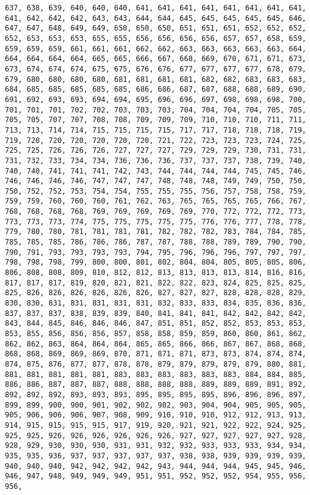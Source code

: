 \documentclass[11pt]{article}
\begin{document}
\begin{Verbatim}[commandchars=\\\{\}]
637, 638, 639, 640, 640, 640, 641, 641, 641, 641, 641, 641, 641, 641, 641, 642, 642, 642, 643, 643, 644, 644, 645, 645, 645, 645, 645, 646, 647, 647, 648, 649, 649, 650, 650, 650, 651, 651, 651, 652, 652, 652, 652, 653, 653, 653, 655, 655, 656, 656, 656, 656, 657, 657, 658, 659, 659, 659, 659, 661, 661, 661, 662, 662, 663, 663, 663, 663, 663, 664, 664, 664, 664, 664, 665, 665, 666, 667, 668, 669, 670, 671, 671, 673, 673, 674, 674, 674, 675, 675, 676, 676, 677, 677, 677, 677, 678, 679, 679, 680, 680, 680, 680, 681, 681, 681, 681, 682, 682, 683, 683, 683, 684, 685, 685, 685, 685, 685, 686, 686, 687, 687, 688, 688, 689, 690, 691, 692, 693, 693, 694, 694, 695, 696, 696, 697, 698, 698, 698, 700, 701, 701, 701, 702, 702, 703, 703, 703, 704, 704, 704, 704, 705, 705, 705, 705, 707, 707, 708, 708, 709, 709, 709, 710, 710, 710, 711, 711, 713, 713, 714, 714, 715, 715, 715, 715, 717, 717, 718, 718, 718, 719, 719, 720, 720, 720, 720, 720, 720, 721, 722, 723, 723, 723, 724, 725, 725, 725, 726, 726, 726, 727, 727, 727, 729, 729, 729, 730, 731, 731, 731, 732, 733, 734, 734, 736, 736, 736, 737, 737, 737, 738, 739, 740, 740, 740, 741, 741, 741, 742, 743, 744, 744, 744, 744, 745, 745, 746, 746, 746, 746, 746, 747, 747, 747, 748, 748, 748, 749, 749, 750, 750, 750, 752, 752, 753, 754, 754, 755, 755, 755, 756, 757, 758, 758, 759, 759, 759, 760, 760, 760, 761, 762, 763, 765, 765, 765, 765, 766, 767, 768, 768, 768, 768, 769, 769, 769, 769, 769, 770, 772, 772, 772, 773, 773, 773, 773, 774, 775, 775, 775, 775, 775, 776, 776, 777, 778, 778, 779, 780, 780, 781, 781, 781, 781, 782, 782, 782, 783, 784, 784, 785, 785, 785, 785, 786, 786, 786, 787, 787, 788, 788, 789, 789, 790, 790, 790, 791, 793, 793, 793, 793, 794, 795, 796, 796, 796, 797, 797, 797, 798, 798, 798, 799, 800, 800, 801, 802, 804, 804, 805, 805, 805, 806, 806, 808, 808, 809, 810, 812, 812, 813, 813, 813, 813, 814, 816, 816, 817, 817, 817, 819, 820, 821, 821, 822, 822, 823, 824, 825, 825, 825, 825, 826, 826, 826, 826, 826, 826, 827, 827, 827, 828, 828, 828, 829, 830, 830, 831, 831, 831, 831, 831, 832, 833, 833, 834, 835, 836, 836, 837, 837, 837, 838, 839, 839, 840, 841, 841, 841, 842, 842, 842, 842, 843, 844, 845, 846, 846, 846, 847, 851, 851, 852, 852, 853, 853, 853, 853, 855, 856, 856, 856, 857, 858, 858, 859, 859, 860, 860, 861, 862, 862, 862, 863, 864, 864, 864, 865, 865, 866, 866, 867, 867, 868, 868, 868, 868, 869, 869, 869, 870, 871, 871, 871, 873, 873, 874, 874, 874, 874, 875, 876, 877, 877, 878, 878, 879, 879, 879, 879, 879, 880, 881, 881, 881, 881, 881, 881, 883, 883, 883, 883, 883, 883, 884, 884, 885, 886, 886, 887, 887, 887, 888, 888, 888, 888, 889, 889, 889, 891, 892, 892, 892, 892, 893, 893, 893, 895, 895, 895, 895, 896, 896, 896, 897, 899, 899, 900, 900, 901, 902, 902, 902, 903, 904, 904, 905, 905, 905, 905, 906, 906, 906, 907, 908, 909, 910, 910, 910, 912, 912, 913, 913, 914, 915, 915, 915, 915, 917, 919, 920, 921, 921, 922, 922, 924, 925, 925, 925, 926, 926, 926, 926, 926, 926, 927, 927, 927, 927, 927, 928, 928, 929, 930, 930, 930, 931, 931, 932, 932, 933, 933, 933, 934, 934, 935, 935, 936, 937, 937, 937, 937, 937, 938, 938, 939, 939, 939, 939, 940, 940, 940, 942, 942, 942, 942, 943, 944, 944, 944, 945, 945, 946, 946, 947, 948, 949, 949, 949, 951, 951, 952, 952, 952, 954, 955, 956, 956, 
\end{Verbatim}
\end{document}
